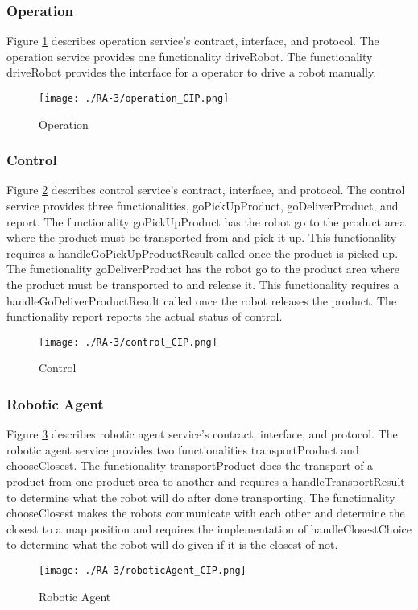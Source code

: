 \subsubsection{Operation} %
Figure \ref{fig:operation_cip} describes operation service's contract, interface, and protocol. The operation service provides one functionality driveRobot. The functionality driveRobot provides the interface for a operator to drive a robot manually.
\begin{figure}[ht!]
 \centering
 \texttt{[image: ./RA-3/operation\_CIP.png]}
 \caption{Operation}
 \label{fig:operation_cip}
\end{figure}

\subsubsection{Control} %
Figure \ref{fig:control_cip} describes control service's contract, interface, and protocol. The control service provides three functionalities, goPickUpProduct, goDeliverProduct, and report. The functionality goPickUpProduct has the robot go to the product area where the product must be transported from and pick it up. This functionality requires a handleGoPickUpProductResult called once the product is picked up. The functionality goDeliverProduct has the robot go to the product area where the product must be transported to and release it. This functionality requires a handleGoDeliverProductResult called once the robot releases the product. The functionality report reports the actual status of control.
\begin{figure}[ht!]
 \centering
 \texttt{[image: ./RA-3/control\_CIP.png]}
 \caption{Control}
 \label{fig:control_cip}
\end{figure}

\subsubsection{Robotic Agent} %
Figure \ref{fig:roboticagent_cip} describes robotic agent service's contract, interface, and protocol. The robotic agent service provides two functionalities transportProduct and chooseClosest. The functionality transportProduct does the transport of a product from one product area to another and requires a handleTransportResult to determine what the robot will do after done transporting. The functionality chooseClosest makes the robots communicate with each other and determine the closest to a map position and requires the implementation of handleClosestChoice to determine what the robot will do given if it is the closest of not. 
\begin{figure}[ht!]
 \centering
 \texttt{[image: ./RA-3/roboticAgent\_CIP.png]}
 \caption{Robotic Agent}
 \label{fig:roboticagent_cip}
\end{figure}

